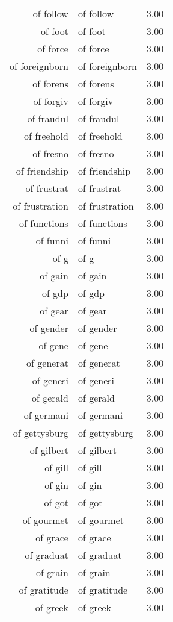 \begin{table}[ht]
\begin{tabular}{rlr}
  of follow & of follow & 3.00 \\ 
  of foot & of foot & 3.00 \\ 
  of force & of force & 3.00 \\ 
  of foreignborn & of foreignborn & 3.00 \\ 
  of forens & of forens & 3.00 \\ 
  of forgiv & of forgiv & 3.00 \\ 
  of fraudul & of fraudul & 3.00 \\ 
  of freehold & of freehold & 3.00 \\ 
  of fresno & of fresno & 3.00 \\ 
  of friendship & of friendship & 3.00 \\ 
  of frustrat & of frustrat & 3.00 \\ 
  of frustration & of frustration & 3.00 \\ 
  of functions & of functions & 3.00 \\ 
  of funni & of funni & 3.00 \\ 
  of g & of g & 3.00 \\ 
  of gain & of gain & 3.00 \\ 
  of gdp & of gdp & 3.00 \\ 
  of gear & of gear & 3.00 \\ 
  of gender & of gender & 3.00 \\ 
  of gene & of gene & 3.00 \\ 
  of generat & of generat & 3.00 \\ 
  of genesi & of genesi & 3.00 \\ 
  of gerald & of gerald & 3.00 \\ 
  of germani & of germani & 3.00 \\ 
  of gettysburg & of gettysburg & 3.00 \\ 
  of gilbert & of gilbert & 3.00 \\ 
  of gill & of gill & 3.00 \\ 
  of gin & of gin & 3.00 \\ 
  of got & of got & 3.00 \\ 
  of gourmet & of gourmet & 3.00 \\ 
  of grace & of grace & 3.00 \\ 
  of graduat & of graduat & 3.00 \\ 
  of grain & of grain & 3.00 \\ 
  of gratitude & of gratitude & 3.00 \\ 
  of greek & of greek & 3.00 \\ 

\end{tabular}
\end{table}
